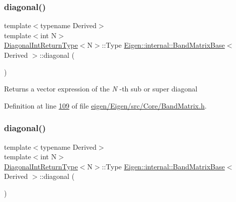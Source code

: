 \subsubsection{\texorpdfstring{diagonal()}{diagonal()}\hspace{0.1cm}{\footnotesize\ttfamily [5/12]}}
{\footnotesize\ttfamily template$<$typename Derived$>$ \\
template$<$int N$>$ \\
\hyperlink{struct_eigen_1_1internal_1_1_band_matrix_base_1_1_diagonal_int_return_type}{Diagonal\+Int\+Return\+Type}$<$N$>$\+::Type \hyperlink{class_eigen_1_1internal_1_1_band_matrix_base}{Eigen\+::internal\+::\+Band\+Matrix\+Base}$<$ Derived $>$\+::diagonal (\begin{DoxyParamCaption}{ }\end{DoxyParamCaption})\hspace{0.3cm}{\ttfamily [inline]}}

\begin{DoxyReturn}{Returns}
a vector expression of the {\itshape N} -\/th sub or super diagonal 
\end{DoxyReturn}


Definition at line \hyperlink{eigen_2_eigen_2src_2_core_2_band_matrix_8h_source_l00109}{109} of file \hyperlink{eigen_2_eigen_2src_2_core_2_band_matrix_8h_source}{eigen/\+Eigen/src/\+Core/\+Band\+Matrix.\+h}.

\mbox{\label{class_eigen_1_1internal_1_1_band_matrix_base_a1d98143681d5c1e2709ce18332a939dc}} 
\subsubsection{\texorpdfstring{diagonal()}{diagonal()}\hspace{0.1cm}{\footnotesize\ttfamily [6/12]}}
{\footnotesize\ttfamily template$<$typename Derived$>$ \\
template$<$int N$>$ \\
\hyperlink{struct_eigen_1_1internal_1_1_band_matrix_base_1_1_diagonal_int_return_type}{Diagonal\+Int\+Return\+Type}$<$N$>$\+::Type \hyperlink{class_eigen_1_1internal_1_1_band_matrix_base}{Eigen\+::internal\+::\+Band\+Matrix\+Base}$<$ Derived $>$\+::diagonal (\begin{DoxyParamCaption}{ }\end{DoxyParamCaption})\hspace{0.3cm}{\ttfamily [inline]}}


